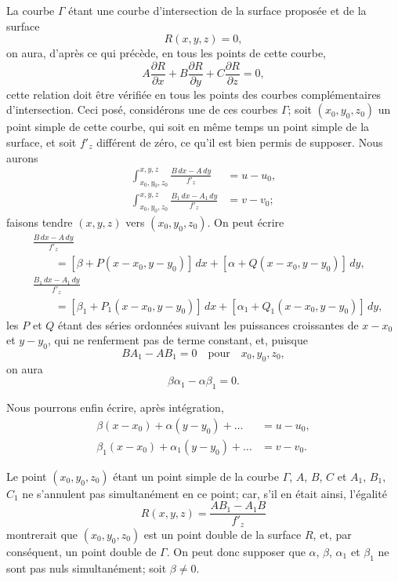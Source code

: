 \documentclass{article}
\begin{document}
La courbe $\Gamma$ étant une courbe d'intersection de la surface proposée et de la surface
\[
R(x, y, z) = 0,
\]
on aura, d'après ce qui précède, en tous les points de cette courbe,
\[
A \frac{\partial R}{\partial x} + B \frac{\partial R}{\partial y} + C \frac{\partial R}{\partial z} = 0,
\]
cette relation doit être vérifiée en tous les points des courbes complémentaires
d'intersection. Ceci posé, considérons une de ces courbes $\Gamma$; soit $(x_{0}, y_{0}, z_{0})$ un point simple de cette courbe, qui soit en même temps un point simple de la surface, et soit $f'_{z}$ différent de zéro, ce qu'il est bien permis de supposer. Nous aurons
\[
\begin{aligned}
\int_{x_{0}, y_{0}, z_{0}}^{x, y, z} \frac{B\,dx - A\,dy}{f'_{z}} &= u - u_{0}, \\
\int_{x_{0}, y_{0}, z_{0}}^{x, y, z} \frac{B_{1}\,dx - A_{1}\,dy}{f'_{z}} &= v - v_{0};
\end{aligned}
\]
faisons tendre $(x, y, z)$ vers $(x_{0}, y_{0}, z_{0})$. On peut écrire
\[
\begin{aligned}
&\frac{B\,dx - A\,dy}{f'_{z}} \\
&\qquad = [\beta + P(x - x_{0}, y - y_{0})]\,dx + [\alpha + Q(x - x_{0}, y - y_{0})]\,dy, \\
&\frac{B_{1}\,dx - A_{1}\,dy}{f'_{z}} \\
&\qquad = [\beta_{1} + P_{1}(x - x_{0}, y - y_{0})]\,dx + [\alpha_{1} + Q_{1}(x - x_{0}, y - y_{0})]\,dy,
\end{aligned}
\]
les $P$ et $Q$ étant des séries ordonnées suivant les puissances croissantes de $x - x_{0}$ et $y - y_{0}$, qui ne renferment pas de terme constant, et, puisque
\[
BA_{1} - AB_{1} = 0 \quad \text{pour} \quad x_{0}, y_{0}, z_{0},
\]
on aura
\[
\beta\alpha_{1} - \alpha\beta_{1} = 0.
\]

Nous pourrons enfin écrire, après intégration,
\[
\begin{aligned}
\beta(x - x_{0}) + \alpha(y - y_{0}) + \ldots &= u - u_{0}, \\
\beta_{1}(x - x_{0}) + \alpha_{1}(y - y_{0}) + \ldots &= v - v_{0}.
\end{aligned}
\tag{I}
\]

Le point $(x_{0}, y_{0}, z_{0})$ étant un point simple de la courbe $\Gamma$, $A$, $B$, $C$ et $A_{1}$, $B_{1}$, $C_{1}$ ne s'annulent pas simultanément en ce point; car, s'il en était ainsi, l'égalité
\[
R(x, y, z) = \frac{AB_{1} - A_{1}B}{f'_{z}}
\]
montrerait que $(x_{0}, y_{0}, z_{0})$ est un point double de la surface $R$, et, par conséquent, un point double de $\Gamma$. On peut donc supposer que $\alpha$, $\beta$, $\alpha_{1}$ et $\beta_{1}$ ne sont pas nuls simultanément; soit $\beta \neq 0$.
\end{document}
